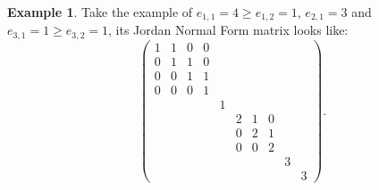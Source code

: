 \documentclass[11pt,openany]{book}
\theoremstyle{plain}
\theoremstyle{definition}
\newtheorem{example}[example]{Example}
\theoremstyle{remark}
\begin{document}
\begin{example}
    \medskip
    Take the example of $e_{1,1}= 4 \geq e_{1,2} = 1$, $e_{2,1} = 3$ and $e_{3,1} = 1 \geq e_{3,2} = 1$, its Jordan Normal Form matrix looks like:
$$\begin{pmatrix} 
1 & 1 & 0 & 0 & & & & & & \\
0 & 1 & 1 & 0 & & & & & & \\ 
0 & 0 & 1 & 1 & & & & & &\\
0 & 0 & 0 & 1 & & & & & &\\
& & & & 1 & & & & & \\
& & & &  & 2 & 1 & 0 & & \\
& & & &  & 0 & 2 & 1 & & \\
& & & &  & 0 & 0 & 2 & & \\
& & & &  &  &  &  & 3 & \\
& & & &  &  &  &  &  & 3
\end{pmatrix}.
$$

    
\end{example}
\end{document}
